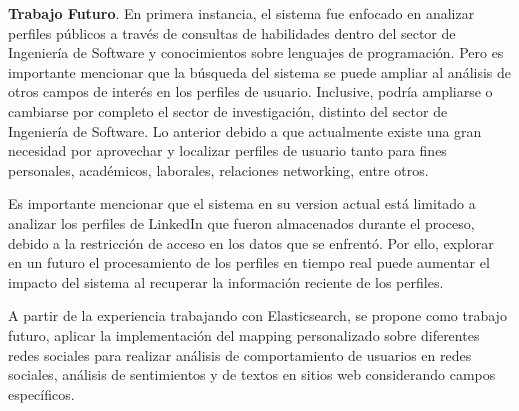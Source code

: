 \textbf{Trabajo Futuro}.
En primera instancia, el sistema fue enfocado en analizar perfiles públicos a través de consultas de habilidades dentro del sector de Ingeniería de Software y conocimientos sobre lenguajes de programación. Pero es importante mencionar que la búsqueda del sistema se puede ampliar al análisis de otros campos de interés en los perfiles de usuario. Inclusive, podría ampliarse o cambiarse por completo el sector de investigación, distinto del sector de Ingeniería de Software. Lo anterior debido a que actualmente existe una gran necesidad por aprovechar y localizar perfiles de usuario tanto para fines personales, académicos, laborales, relaciones networking, entre otros.

Es importante mencionar que el sistema en su version actual está limitado a analizar los perfiles de LinkedIn que fueron almacenados durante el proceso, debido a la restricción de acceso en los datos que se enfrentó. Por ello, explorar en un futuro el procesamiento de los perfiles en tiempo real puede aumentar el impacto del sistema al recuperar la información reciente de los perfiles.

A partir de la experiencia trabajando con Elasticsearch, se propone como trabajo futuro, aplicar la implementación del mapping personalizado sobre diferentes redes sociales para realizar an\'alisis de comportamiento de usuarios en redes sociales, an\'alisis de sentimientos y de textos en sitios web considerando campos espec\'ificos.
